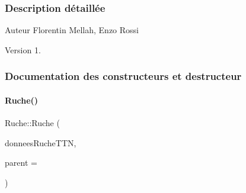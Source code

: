 \subsubsection{Description détaillée}
\begin{DoxyAuthor}{Auteur}
Florentin Mellah, Enzo Rossi
\end{DoxyAuthor}
\begin{DoxyVersion}{Version}
1. 
\end{DoxyVersion}


\subsubsection{Documentation des constructeurs et destructeur}
\mbox{\label{class_ruche_a8b4ee3752d984c5acee93b990db7939a}} 
\paragraph{\texorpdfstring{Ruche()}{Ruche()}}
{\footnotesize\ttfamily Ruche\+::\+Ruche (\begin{DoxyParamCaption}\item[{Q\+String\+List}]{donnees\+Ruche\+T\+TN,  }\item[{\hyperlink{class_q_object}{Q\+Object} $\ast$}]{parent = {} }\end{DoxyParamCaption})}



